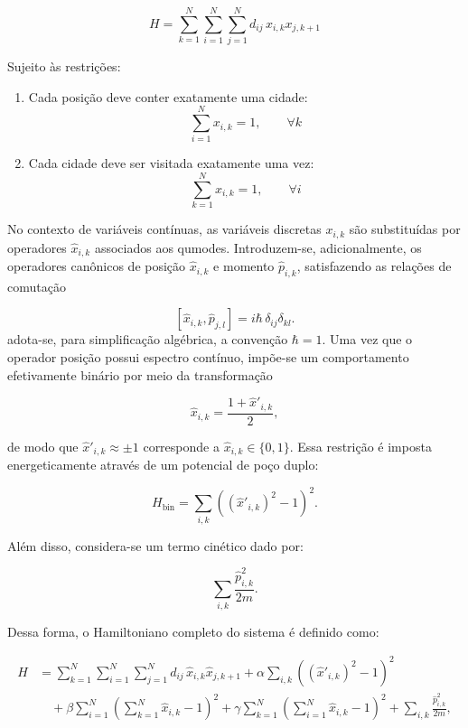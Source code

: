     $$
        \label{eq:objective_function_hamiltonian}
        H = \sum_{k=1}^N \sum_{i=1}^N \sum_{j=1}^N d_{ij}\, x_{i,k} x_{j,k+1}
    $$

    Sujeito às restrições:

    \begin{enumerate}
        \item Cada posição deve conter exatamente uma cidade:
        $$
            \sum_{i=1}^N x_{i,k} = 1, \qquad \forall k
        $$

        \item Cada cidade deve ser visitada exatamente uma vez:
        $$
            \sum_{k=1}^N x_{i,k} = 1, \qquad \forall i
        $$
    \end{enumerate}

    No contexto de variáveis contínuas, as variáveis discretas $x_{i,k}$ são substituídas por operadores $\hat{x}_{i,k}$ associados aos qumodes. Introduzem-se, adicionalmente, os operadores canônicos de posição $\hat{x}_{i,k}$ e momento $\hat{p}_{i,k}$, satisfazendo as relações de comutação

    $$
    [\hat{x}_{i,k}, \hat{p}_{j,l}] = i\hbar\,\delta_{ij}\delta_{kl}.
    $$
    \noindent adota-se, para simplificação algébrica, a convenção $\hbar=1$. Uma vez que o operador posição possui espectro contínuo, impõe-se um comportamento efetivamente binário por meio da transformação


    $$
    \hat{x}_{i,k} = \frac{1 + \hat{x}'_{i,k}}{2},
    $$

    \noindent de modo que $\hat{x}'_{i,k} \approx \pm 1$ corresponde a $\hat{x}_{i,k} \in \{0,1\}$. Essa restrição é imposta energeticamente através de um potencial de poço duplo:

    $$
    H_{\text{bin}} = \sum_{i,k} \left( (\hat{x}'_{i,k})^2 - 1 \right)^2.
    $$

    Além disso, considera-se um termo cinético dado por:

    $$
    \sum_{i,k} \frac{\hat{p}_{i,k}^2}{2m}.
    $$

    Dessa forma, o Hamiltoniano completo do sistema é definido como:

    \begin{equation}
    \begin{aligned}
    H &= \sum_{k=1}^N \sum_{i=1}^N \sum_{j=1}^N d_{ij}\, \hat{x}_{i,k}\hat{x}_{j,k+1}
        + \alpha \sum_{i,k} \left( (\hat{x}'_{i,k})^2 - 1 \right)^2 \\
        &\quad + \beta \sum_{i=1}^N \left(\sum_{k=1}^N \hat{x}_{i,k} - 1 \right)^2
        + \gamma \sum_{k=1}^N \left(\sum_{i=1}^N \hat{x}_{i,k} - 1 \right)^2
        + \sum_{i,k} \frac{\hat{p}_{i,k}^2}{2m},
    \end{aligned}
    \end{equation}

